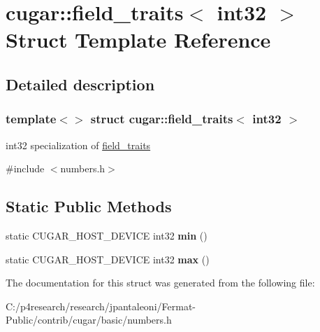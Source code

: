 \hypertarget{structcugar_1_1field__traits_3_01int32_01_4}{}\section{cugar\+:\+:field\+\_\+traits$<$ int32 $>$ Struct Template Reference}
\label{structcugar_1_1field__traits_3_01int32_01_4}


\subsection{Detailed description}
\subsubsection*{template$<$$>$\newline
struct cugar\+::field\+\_\+traits$<$ int32 $>$}

int32 specialization of \hyperlink{structcugar_1_1field__traits}{field\+\_\+traits} 

{\ttfamily \#include $<$numbers.\+h$>$}

\subsection*{Static Public Methods}
\begin{DoxyCompactItemize}
\item 
\mbox{\label{structcugar_1_1field__traits_3_01int32_01_4_a81ce81096221ca704e627ac53cc1321e}} 
static C\+U\+G\+A\+R\+\_\+\+H\+O\+S\+T\+\_\+\+D\+E\+V\+I\+CE int32 {\bfseries min} ()
\item 
\mbox{\label{structcugar_1_1field__traits_3_01int32_01_4_a1c6b1b7ef0a0ffb3309da0e8f19d6d10}} 
static C\+U\+G\+A\+R\+\_\+\+H\+O\+S\+T\+\_\+\+D\+E\+V\+I\+CE int32 {\bfseries max} ()
\end{DoxyCompactItemize}


The documentation for this struct was generated from the following file\+:\begin{DoxyCompactItemize}
\item 
C\+:/p4research/research/jpantaleoni/\+Fermat-\/\+Public/contrib/cugar/basic/numbers.\+h\end{DoxyCompactItemize}
